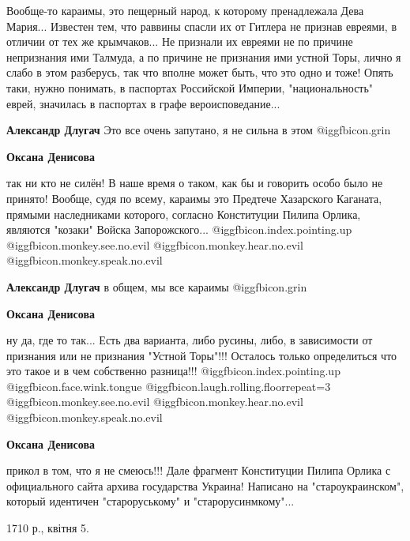 \begin{itemize}

Вообще-то караимы, это пещерный народ, к которому пренадлежала Дева Мария...
Известен тем, что раввины спасли их от Гитлера не признав евреями, в отличии от
тех же крымчаков... Не признали их евреями не по причине непризнания ими
Талмуда, а по причине не признания ими устной Торы, лично я слабо в этом
разберусь, так что вполне может быть, что это одно и тоже! Опять таки, нужно
понимать, в паспортах Российской Империи, "национальность" еврей, значилась в
паспортах в графе вероисповедание...

\begin{itemize} %
\textbf{Александр Длугач} Это все очень запутано, я не сильна в этом  @igg{fbicon.grin} 

\textbf{Оксана Денисова} 

так ни кто не силён! В наше время о таком, как бы и говорить особо было не
принято! Вообще, судя по всему, караимы это Предтече Хазарского Каганата,
прямыми наследниками которого, согласно Конституции Пилипа Орлика, являются
"козаки" Войска Запорожского... @igg{fbicon.index.pointing.up} 
@igg{fbicon.monkey.see.no.evil}  @igg{fbicon.monkey.hear.no.evil}  @igg{fbicon.monkey.speak.no.evil} 

\textbf{Александр Длугач} в общем, мы все караимы @igg{fbicon.grin} 

\textbf{Оксана Денисова} 

ну да, где то так... Есть два варианта, либо русины, либо, в зависимости от
признания или не признания "Устной Торы"!!! Осталось только определиться что
это такое и в чем собственно разница!!! @igg{fbicon.index.pointing.up} @igg{fbicon.face.wink.tongue}  @igg{fbicon.laugh.rolling.floor}{repeat=3}  @igg{fbicon.monkey.see.no.evil}  @igg{fbicon.monkey.hear.no.evil}  @igg{fbicon.monkey.speak.no.evil} 


\textbf{Оксана Денисова} 

прикол в том, что я не смеюсь!!! Дале фрагмент Конституции Пилипа Орлика с
официального сайта архива государства Украина! Написано на "староукраинском",
который идентичен "староруському" и "старорусинмкому"...

1710 р., квітня 5.


\end{itemize}
\end{itemize}
